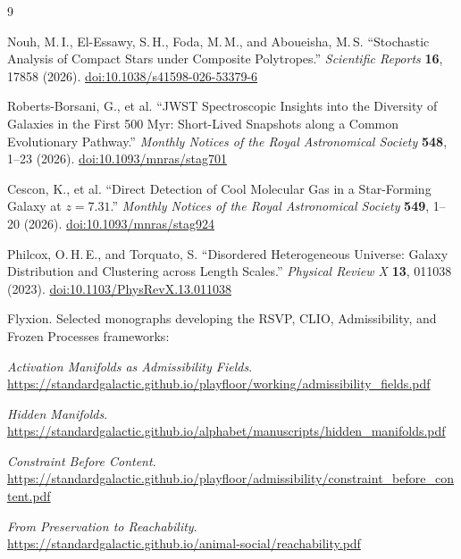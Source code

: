\documentclass[12pt, oneside]{article}
\begin{document}
\begin{thebibliography}{9}

Nouh, M.\,I., El-Essawy, S.\,H., Foda, M.\,M., and Aboueisha, M.\,S.
\newblock ``Stochastic Analysis of Compact Stars under Composite Polytropes.''
\newblock \textit{Scientific Reports} \textbf{16}, 17858 (2026).
\newblock \href{https://doi.org/10.1038/s41598-026-53379-6}{doi:10.1038/s41598-026-53379-6}

Roberts-Borsani, G., et al.
\newblock ``JWST Spectroscopic Insights into the Diversity of Galaxies in the First 500 Myr: Short-Lived Snapshots along a Common Evolutionary Pathway.''
\newblock \textit{Monthly Notices of the Royal Astronomical Society} \textbf{548}, 1--23 (2026).
\newblock \href{https://doi.org/10.1093/mnras/stag701}{doi:10.1093/mnras/stag701}

Cescon, K., et al.
\newblock ``Direct Detection of Cool Molecular Gas in a Star-Forming Galaxy at $z = 7.31$.''
\newblock \textit{Monthly Notices of the Royal Astronomical Society} \textbf{549}, 1--20 (2026).
\newblock \href{https://doi.org/10.1093/mnras/stag924}{doi:10.1093/mnras/stag924}

Philcox, O.\,H.\,E., and Torquato, S.
\newblock ``Disordered Heterogeneous Universe: Galaxy Distribution and Clustering across Length Scales.''
\newblock \textit{Physical Review X} \textbf{13}, 011038 (2023).
\newblock \href{https://doi.org/10.1103/PhysRevX.13.011038}{doi:10.1103/PhysRevX.13.011038}

Flyxion.
\newblock Selected monographs developing the RSVP, CLIO, Admissibility, and Frozen Processes frameworks:

\medskip
\noindent\textit{Activation Manifolds as Admissibility Fields}.\\
\url{https://standardgalactic.github.io/playfloor/working/admissibility_fields.pdf}

\smallskip
\noindent\textit{Hidden Manifolds}.\\
\url{https://standardgalactic.github.io/alphabet/manuscripts/hidden_manifolds.pdf}

\smallskip
\noindent\textit{Constraint Before Content}.\\
\url{https://standardgalactic.github.io/playfloor/admissibility/constraint_before_content.pdf}

\smallskip
\noindent\textit{From Preservation to Reachability}.\\
\url{https://standardgalactic.github.io/animal-social/reachability.pdf}


\end{thebibliography}
\end{document}
